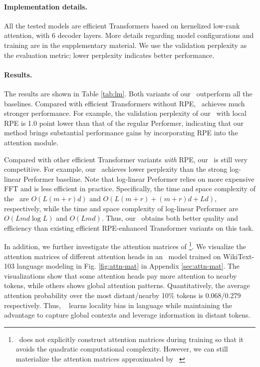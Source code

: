 \paragraph{Implementation details.} All the tested models are efficient Transformers based on kernelized low-rank attention, with 6 decoder layers. More details regarding model configurations and training are in the supplementary material. We use the validation perplexity as the evaluation metric; lower perplexity indicates better performance.

\paragraph{Results.}
The results are shown in Table \ref{tab:lm}. Both variants of our \FLT~outperform all the baselines. Compared with efficient Transformers without RPE, \FLT~achieves much stronger performance. For example, the validation perplexity of our \FLT~with local RPE is 1.0 point lower than that of the regular Performer, indicating that our method brings substantial performance gains by incorporating RPE into the attention module.

Compared with other efficient Transformer variants \textit{with} RPE, our \FLT~is still very competitive. For example, our \FLT~achieves lower perplexity than the strong log-linear Performer baseline. Note that log-linear Performer relies on more expensive FFT and is less efficient in practice. Specifically, the time and space complexity of the \FLT~are $O(L(m+r)d)$ and $O(L(m+r)+(m+r)d+Ld)$, respectively, while the time and space complexity of log-linear Performer are $O(Lmd\log L)$ and $O(Lmd)$.
Thus, our \FLT~obtains both better quality and efficiency than existing efficient RPE-enhanced Transformer variants on this task. 

In addition, we further investigate the attention matrices of \FLT\footnote{\FLT~does not explicitly construct attention matrices during training so that it avoids the quadratic computational complexity. However, we can still materialize the attention matrices approximated by \FLT~}. We visualize the attention matrices of different attention heads in an \FLT~model trained on WikiText-103 language modeling in Fig. \ref{fig:attn-mat} in Appendix \ref{sec:attn-mat}. The visualizations show that some attention heads pay more attention to nearby tokens, while others shows global attention patterns. Quantitatively, the average attention probability over the most distant/nearby 10\% tokens is 0.068/0.279 respectively. Thus, \FLT~ learns locality bias in language while maintaining the advantage to capture global contexts and leverage information in distant tokens.

